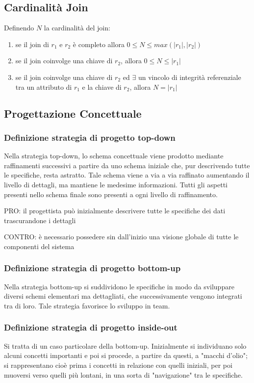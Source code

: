 \subsection{Cardinalità Join}
Definendo $N$ la cardinalità del join:

\begin{enumerate}
  \item se il join di $r_{1}$ e $r_{2}$ è completo allora $ 0 \leq N \leq max(\left\vert{r_{1}}\right\vert, \left\vert{r_{2}}\right\vert)$
  \item se il join coinvolge una chiave di $r_{2}$, allora $ 0 \leq N \leq \left\vert{r_{1}}\right\vert$
  \item se il join coinvolge una chiave di $r_{2}$ ed $\exists$ un vincolo di integrità referenziale
        tra un attributo di $r_{1}$ e la chiave di $r_{2}$, allora $ N = \left\vert{r_{1}}\right\vert $
\end{enumerate}

\subsection{Progettazione Concettuale}
\subsubsection{Definizione strategia di progetto top-down}

Nella strategia top-down, lo schema concettuale viene prodotto mediante raffinamenti
successivi a partire da uno schema iniziale che, pur descrivendo tutte le specifiche,
resta astratto. Tale schema viene a via a via raffinato aumentando il livello di dettagli,
ma mantiene le medesime informazioni. Tutti gli aspetti presenti nello schema finale
sono presenti a ogni livello di raffinamento.

\noindent
PRO: il progettista può inizialmente descrivere tutte le specifiche dei dati
trascurandone i dettagli

\noindent
CONTRO: è necessario possedere sin dall'inizio una visione globale di tutte le componenti
del sistema

\subsubsection{Definizione strategia di progetto bottom-up}

Nella strategia bottom-up si suddividono le specifiche in modo da sviluppare
diversi schemi elementari ma dettagliati, che successivamente vengono integrati
tra di loro. Tale strategia favorisce lo sviluppo in team.

\subsubsection{Definizione strategia di progetto inside-out}

Si tratta di un caso particolare della bottom-up. Inizialmente si individuano solo alcuni
concetti importanti e poi si procede, a partire da questi, a "macchi d'olio"; si rappresentano
cioè prima i concetti in relazione con quelli iniziali, per poi muoversi verso quelli più
lontani, in una sorta di "navigazione" tra le specifiche.